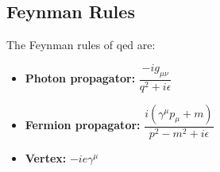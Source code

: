 \subsection{Feynman Rules}
\label{sec:APPENDIX_DERIVATIONS_FEYNMAN_RULES}

The Feynman rules of \gls{qed} are:
\begin{itemize}
  \item \textbf{Photon propagator:} $\dfrac{-ig_{\mu\nu}}{q^2 + i\epsilon}$
  \item \textbf{Fermion propagator:} $\dfrac{i(\gamma^\mu p_\mu + m)}{p^2 - m^2 + i\epsilon}$
  \item \textbf{Vertex:} $-ie\gamma^\mu$
\end{itemize}
